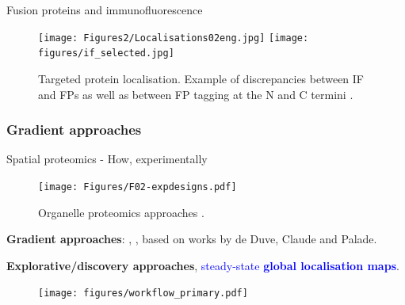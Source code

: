 \begin{frame}{Fusion proteins and immunofluorescence}

  \begin{figure}[h]
    \centering
    \texttt{[image: Figures2/Localisations02eng.jpg]}
    \texttt{[image: figures/if\_selected.jpg]}
    \caption{Targeted protein localisation. Example of discrepancies
      between IF and FPs as well as between FP tagging at the N and C
      termini \citep{Stadler:2013}.}
  \end{figure}
\end{frame}


\subsubsection*{Gradient approaches}
\label{sec:grad}

\begin{frame}{Spatial proteomics - How, experimentally}
  \begin{figure}
    \texttt{[image: Figures/F02-expdesigns.pdf]}
    \caption{Organelle proteomics approaches
      \citep{Gatto:2010}.}
  \end{figure}

  \textbf{Gradient approaches}: \cite{Dunkley:2006},
  \cite{Foster2006}, based on works by de Duve, Claude and Palade.

  \bigskip

  \textbf{Explorative/discovery approaches},
  \textcolor{Blue}{steady-state \textbf{global localisation maps}}.
\end{frame}


\begin{frame}{}
  \begin{figure}
    \texttt{[image: figures/workflow\_primary.pdf]}
  \end{figure}
\end{frame}

